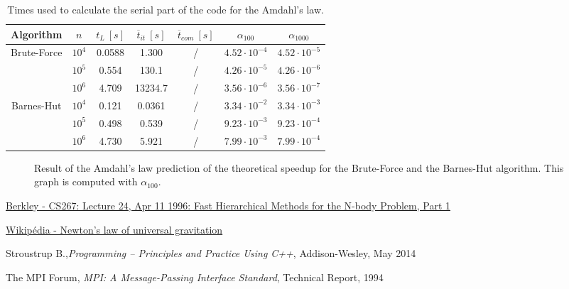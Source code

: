 \documentclass[11pt,a4paper]{article}
\begin{document}
\newpage
\begin{table}[h]
\centering
\begin{tabular}{|c||c|c|c|c||c|c|}
\hline
Algorithm & $n$ & $t_L~[s]$ & $\overline{t}_{it}~[s]$ & $\overline{t}_{com}~[s]$ & $\alpha_{100}$ & $\alpha_{1000}$ \\
\hline \hline
\multirow{3}{*}{Brute-Force} & $10^4$ & 0.0588 & 1.300 & / & $4.52\cdot10^{-4}$ & $4.52\cdot10^{-5}$ \\ \cline{2-7}
& $10^5$ & 0.554 & 130.1 & / & $4.26\cdot10^{-5}$ & $4.26\cdot10^{-6}$ \\ \cline{2-7}
& $10^6$ & 4.709 & 13234.7 & / & $3.56\cdot10^{-6}$ & $3.56\cdot10^{-7}$ \\ \hline
\multirow{3}{*}{Barnes-Hut} & $10^4$ & 0.121 & 0.0361 & / & $3.34\cdot10^{-2}$ & $3.34\cdot10^{-3}$ \\ \cline{2-7}
& $10^5$ & 0.498 & 0.539 & / & $9.23\cdot10^{-3}$ & $9.23\cdot10^{-4}$ \\ \cline{2-7}
& $10^6$ & 4.730 & 5.921 & / & $7.99\cdot10^{-3}$ & $7.99\cdot10^{-4}$ \\ \hline
\end{tabular}
   \caption{Times used to calculate the serial part of the code for the Amdahl's law.}
   \label{tab:amdahl}  
\end{table}

\begin{figure}[H]
\centering

\caption{\label{fig:amdahl} Result of the Amdahl's law prediction of the theoretical speedup for the Brute-Force and the Barnes-Hut algorithm. This graph is computed with $\alpha_{100}$.}
\end{figure}


\begin{thebibliography}{1}

 \href{http://http.cs.berkeley.edu/~demmel/cs267/lecture26/lecture26.html}{Berkley - CS267: Lecture 24, Apr 11 1996: Fast Hierarchical Methods for the N-body Problem, Part 1}

 \href{https://en.wikipedia.org/wiki/Newton's\_law\_of\_universal\_gravitation}{Wikip\'edia - Newton's law of universal gravitation}

 Stroustrup B.,{\em Programming -- Principles and Practice Using C++}, Addison-Wesley, May 2014

 The MPI Forum, {\em MPI: A Message-Passing Interface Standard}, Technical Report, 1994

\end{thebibliography}
\end{document}
